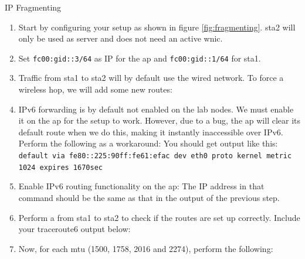 \begin{exercise}{IP Fragmenting}
	\begin{enumerate}
		\item Start by configuring your setup as shown in figure \ref{fig:fragmenting}. \ac{sta}2 will only be used as  server and does not need an active \ac{wnic}.
		\item Set \texttt{fc00:\acs{gid}::3/64} as IP for the \ac{ap} and \texttt{fc00:\acs{gid}::1/64} for \ac{sta}1.
		\item Traffic from \ac{sta}1 to \ac{sta}2 will by default use the wired network. To force a wireless hop, we will add some new routes:\newline
		\item IPv6 forwarding is by default not enabled on the lab nodes. We must enable it on the \ac{ap} for the setup to work. However, due to a bug, the \ac{ap} will clear its default route when we do this, making it instantly inaccessible over IPv6. Perform the following as a workaround:\newline
		You should get output like this:\newline
		\texttt{default via fe80::225:90ff:fe61:efac dev eth0  proto kernel  metric 1024  expires 1670sec}
		\item Enable IPv6 routing functionality on the \ac{ap}:\newline
		\newline
		The IP address in that command should be the same as that in the output of the previous step.
		\item Perform a  from \ac{sta}1 to \ac{sta}2 to check if the routes are set up correctly. Include your traceroute6 output below:\newline
		\newline
		\begin{esolution}
		\end{esolution}
		\item Now, for each \ac{mtu} (1500, 1758, 2016 and 2274), perform the following:\newline
		\begin{itemize}

\end{itemize}
\end{enumerate}
\end{exercise}
